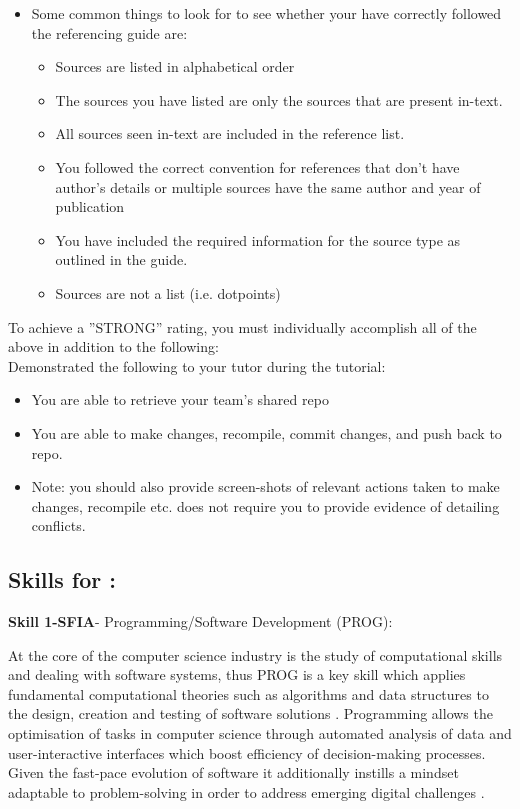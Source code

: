 \documentclass[a4paper, 11pt]{report}
\begin{document}
\begin{itemize}
\begin{itemize}
	\item Some common things to look for to see whether your have correctly followed the referencing guide are:
		\begin{itemize}
		\item Sources are listed in alphabetical order
		\item The sources you have listed are only the sources that are present in-text.
		\item All sources seen in-text are included in the reference list.
		\item You followed the correct convention for references that don’t have author’s details or multiple sources have the same author and year of publication
		\item You have included the required information for the source type as outlined in the guide.
		\item Sources are not a list (i.e. dotpoints)
		\end{itemize}
	\end{itemize}
\end{itemize}

To achieve a ''STRONG'' rating, you must individually accomplish all of the above in addition to the following:\\
Demonstrated the following to your tutor during the tutorial:
\begin{itemize}
\item You are able to retrieve your team’s shared repo
\item You are able to make changes, recompile, commit changes, and push back to repo.
\item Note: you should also provide screen-shots of relevant actions taken to make changes, recompile etc. does not require you to provide evidence of detailing conflicts.
\end{itemize}



\subsection{Skills for \majA: \studA}

\textbf{Skill 1-SFIA}- Programming/Software Development (PROG):

At the core of the computer science industry is the study of computational skills and dealing with software systems, thus PROG is a key skill which applies fundamental computational theories such as algorithms and data structures to the design, creation and testing of software solutions \cite{prog}. Programming allows the optimisation of tasks in computer science through automated analysis of data \cite{codiska} and user-interactive interfaces which boost efficiency of decision-making processes. Given the fast-pace evolution of software it additionally instills a mindset adaptable to problem-solving in order to address emerging digital challenges \cite{osmani}.
\end{document}
